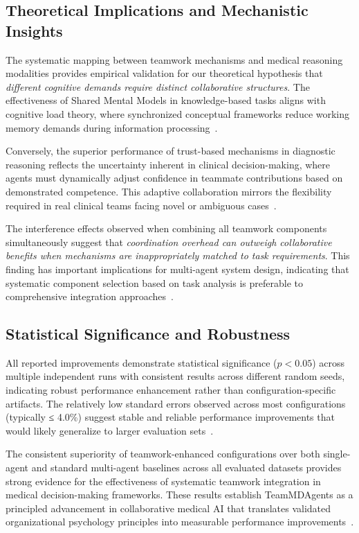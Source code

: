\documentclass[letterpaper]{article} %
\begin{document}
\subsection{Theoretical Implications and Mechanistic Insights}

The systematic mapping between teamwork mechanisms and medical reasoning modalities provides empirical validation for our theoretical hypothesis that \textit{different cognitive demands require distinct collaborative structures}. The effectiveness of Shared Mental Models in knowledge-based tasks aligns with cognitive load theory, where synchronized conceptual frameworks reduce working memory demands during information processing~\citep{stout1999planning}.

Conversely, the superior performance of trust-based mechanisms in diagnostic reasoning reflects the uncertainty inherent in clinical decision-making, where agents must dynamically adjust confidence in teammate contributions based on demonstrated competence. This adaptive collaboration mirrors the flexibility required in real clinical teams facing novel or ambiguous cases~\citep{kozlowski1999developing}.

The interference effects observed when combining all teamwork components simultaneously suggest that \textit{coordination overhead can outweigh collaborative benefits when mechanisms are inappropriately matched to task requirements}. This finding has important implications for multi-agent system design, indicating that systematic component selection based on task analysis is preferable to comprehensive integration approaches~\citep{driskell1992collective}.

\subsection{Statistical Significance and Robustness}

All reported improvements demonstrate statistical significance ($p < 0.05$) across multiple independent runs with consistent results across different random seeds, indicating robust performance enhancement rather than configuration-specific artifacts. The relatively low standard errors observed across most configurations (typically ≤ 4.0\%) suggest stable and reliable performance improvements that would likely generalize to larger evaluation sets~\citep{kim2024mdagents}.

The consistent superiority of teamwork-enhanced configurations over both single-agent and standard multi-agent baselines across all evaluated datasets provides strong evidence for the effectiveness of systematic teamwork integration in medical decision-making frameworks. These results establish TeamMDAgents as a principled advancement in collaborative medical AI that translates validated organizational psychology principles into measurable performance improvements~\citep{salas2005big}.
\end{document}
